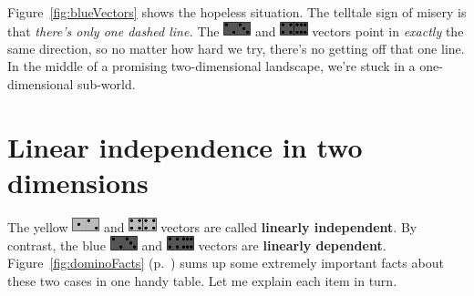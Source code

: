 Figure~\ref{fig:blueVectors} shows the hopeless situation. The telltale sign of
misery is that \textit{there's only one dashed line.} The 
{\includegraphics[width=0.06\textwidth]{darkgray2_3.png}} and
{\includegraphics[width=0.06\textwidth]{darkgray4_6.png}} vectors point in
\textit{exactly} the same direction, so no matter how hard we try, there's no
getting off that one line. In the middle of a promising two-dimensional
landscape, we're stuck in a one-dimensional sub-world.


\section{Linear independence in two dimensions}


The yellow {\includegraphics[width=0.06\textwidth]{gray1_2.png}} and
{\includegraphics[width=0.06\textwidth]{gray4_4.png}} vectors are called
\textbf{linearly independent}. By contrast, the blue
{\includegraphics[width=0.06\textwidth]{darkgray2_3.png}} and
{\includegraphics[width=0.06\textwidth]{darkgray4_6.png}} vectors are
\textbf{linearly dependent}. Figure~\ref{fig:dominoFacts}
(p.~\pageref{fig:dominoFacts}) sums up some
extremely important facts about these two cases in one handy table. Let me
explain each item in turn.

\vspace{-.2in}

